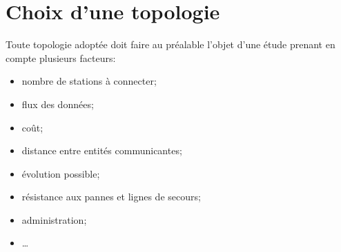 \section{Choix d'une topologie}
Toute topologie adoptée doit faire au préalable l'objet d'une étude prenant en compte plusieurs facteurs:

\begin{itemize}
	\item nombre de stations à connecter;
	\item flux des données;
	\item coût;
	\item distance entre entités communicantes;
	\item évolution possible;
	\item résistance aux pannes et lignes de secours;
	\item administration;
	\item \ldots
\end{itemize}

